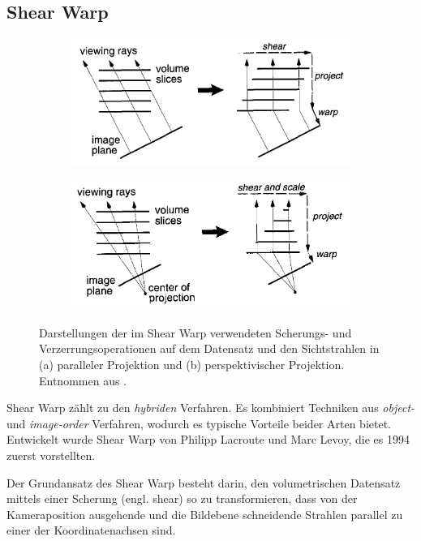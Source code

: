 \documentclass[a4paper,fontsize=12pt,toc=bib,parskip=half,ngerman]{scrartcl}
\begin{document}
\subsection{Shear Warp}
\begin{figure}
	\centering
	\begin{subfigure}{0.49\textwidth}
		\includegraphics[width=\textwidth]{pictures/ShearWarp1}
		\caption{}
		\label{ShearWarp1}
	\end{subfigure}
	\hfill
	\begin{subfigure}{0.49\textwidth}
		\includegraphics[width=\textwidth]{pictures/ShearWarp2}
		\caption{}
		\label{ShearWarp2}
	\end{subfigure}
	\caption{Darstellungen der im Shear Warp verwendeten Scherungs- und Verzerrungsoperationen auf dem Datensatz und den Sichtstrahlen in (a) paralleler Projektion und (b) perspektivischer Projektion. Entnommen aus \cite{lacroute1994fast}.}
\end{figure}
Shear Warp z\"ahlt zu den \textit{hybriden} Verfahren. Es kombiniert Techniken aus \textit{object-} und \textit{image-order} Verfahren, wodurch es typische Vorteile beider Arten bietet. Entwickelt wurde Shear Warp von Philipp Lacroute und Marc Levoy, die es 1994 zuerst vorstellten\cite{lacroute1994fast}. 

Der Grundansatz des Shear Warp besteht darin, den volumetrischen Datensatz mittels einer Scherung (engl. \glq shear\grq{}) so zu transformieren, dass von der Kameraposition ausgehende und die Bildebene schneidende Strahlen parallel zu einer der Koordinatenachsen sind. 
\end{document}
